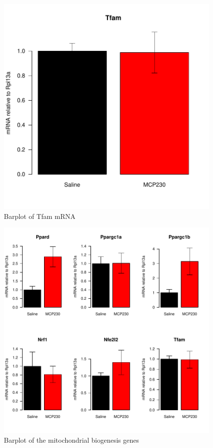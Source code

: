 \documentclass{article}
\begin{document}
\begin{figure}
\begin{center}
\includegraphics{MaternalParticulateMitoBiogen-barplotTfam}
\end{center}
\caption{Barplot of Tfam mRNA}
\label{fig:barplotTfam}
\end{figure}

\begin{figure}
\begin{center}
\includegraphics{MaternalParticulateMitoBiogen-barplot-combined}
\end{center}
\caption{Barplot of the mitochondrial biogenesis genes}
\label{fig:barplot-combined}
\end{figure}
\end{document}
